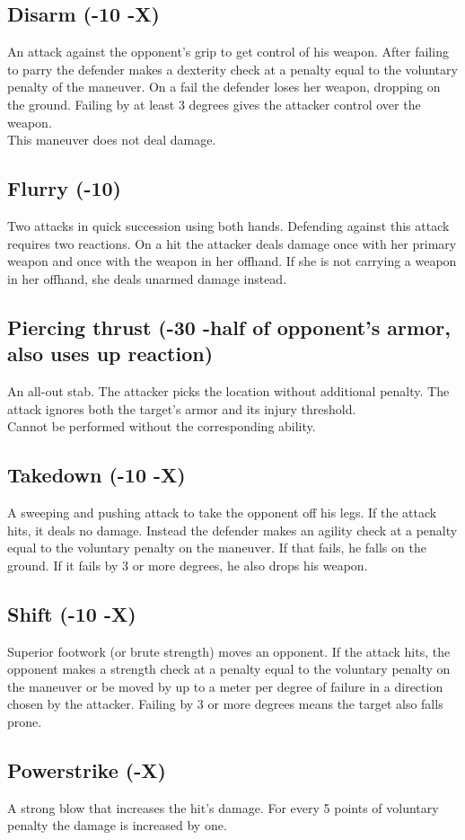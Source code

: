 \subsection*{Disarm (-10 -X)}
An attack against the opponent’s grip to get control of his weapon. After failing to parry the defender makes a dexterity check at a penalty equal to the voluntary penalty of the maneuver. On a fail the defender loses her weapon, dropping on the ground. Failing by at least 3 degrees gives the attacker control over the weapon.\\
This maneuver does not deal damage.
\subsection*{Flurry (-10)}
Two attacks in quick succession using both hands. Defending against this attack requires two reactions. On a hit the attacker deals damage once with her primary weapon and once with the weapon in her offhand. If she is not carrying a weapon in her offhand, she deals unarmed damage instead. 
\subsection*{Piercing thrust (-30 -half of opponent’s armor, also uses up reaction)}
An all-out stab. The attacker picks the location without additional penalty. The attack ignores both the target's armor and its injury threshold.\\
Cannot be performed without the corresponding ability.
\subsection*{Takedown (-10 -X)}
A sweeping and pushing attack to take the opponent off his legs. If the attack hits, it deals no damage. Instead the defender makes an agility check at a penalty equal to the voluntary penalty on the maneuver. If that fails, he falls on the ground. If it fails by 3 or more degrees, he also drops his weapon.
\subsection*{Shift (-10 -X)}
Superior footwork (or brute strength) moves an opponent.
If the attack hits,
	the opponent makes a strength check at a penalty equal to the voluntary penalty on the maneuver
	or be moved by up to a meter per degree of failure in a direction chosen by the attacker.
Failing by 3 or more degrees means the target also falls prone.
\subsection*{Powerstrike (-X)}
\label{mvr:powerstrike}
A strong blow that increases the hit’s damage. For every 5 points of voluntary penalty the damage is increased by one.
